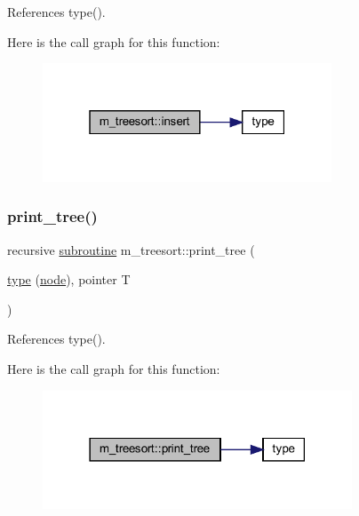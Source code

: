 References type().

Here is the call graph for this function\+:
\nopagebreak
\begin{figure}[H]
\begin{center}
\leavevmode
\includegraphics[width=244pt]{namespacem__treesort_a98f5c84e643f81e068aec72ac569c3d1_cgraph}
\end{center}
\end{figure}
\mbox{\label{namespacem__treesort_adbff3cab09e78694a914782b533e2732}} 
\subsubsection{\texorpdfstring{print\+\_\+tree()}{print\_tree()}}
{\footnotesize\ttfamily recursive \hyperlink{M__stopwatch_83_8txt_acfbcff50169d691ff02d4a123ed70482}{subroutine} m\+\_\+treesort\+::print\+\_\+tree (\begin{DoxyParamCaption}\item[{\hyperlink{stop__watch_83_8txt_a70f0ead91c32e25323c03265aa302c1c}{type} (\hyperlink{structm__treesort_1_1node}{node}), pointer}]{T }\end{DoxyParamCaption})}



References type().

Here is the call graph for this function\+:
\nopagebreak
\begin{figure}[H]
\begin{center}
\leavevmode
\includegraphics[width=261pt]{namespacem__treesort_adbff3cab09e78694a914782b533e2732_cgraph}
\end{center}
\end{figure}
